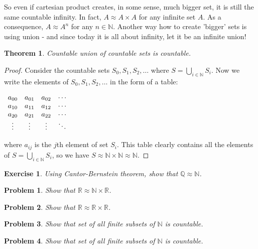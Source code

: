 \documentclass[11pt,a5paper]{article}
\newtheorem{theorem}{Theorem}
\newtheorem{exercise}{Exercise}
\newtheorem{problem}{Problem}
\begin{document}
\noindent So even if cartesian product creates, in some sense, much bigger set, it is still the same countable infinity. In fact, $A\approx A\times A$ for any infinite set $A$. As a consequence, $A\approx A^n$ for any $n\in \mathbb{N}$. Another way how to create 'bigger' sets is using union - and since today it is all about infinity, let it be an infinite union!
\begin{theorem}
Countable union of countable sets is countable.
\end{theorem}
\begin{proof} Consider the countable sets $S_0, S_1, S_2, \ldots$ where $\displaystyle S = \bigcup_{i \mathop \in \mathbb{N}} {S_i}$. Now we write the elements of $S_0, S_1, S_2, \ldots$ in the form of a table:

$\begin{array} {*{4}c} {a_{00}} & {a_{01}} & {a_{02}} & \cdots \\ {a_{10}} & {a_{11}} & {a_{12}} & \cdots \\ {a_{20}} & {a_{21}} & {a_{22}} & \cdots \\ \vdots & \vdots & \vdots & \ddots \\ \end{array}$

\noindent where $a_{ij}$ is the $j$th element of set $S_i$. This table clearly contains all the elements of $\displaystyle S = \bigcup_{i \mathop \in \mathbb{N}} {S_i}$, so we have $S \approx \mathbb{N}\times\mathbb{N} \approx \mathbb{N}$.
\end{proof}

\begin{exercise} Using Cantor-Bernstein theorem, show that $\mathbb{Q}\approx\mathbb{N}$. 
\end{exercise}
\begin{problem} Show that $\mathbb{R} \approx \mathbb{N} \times \mathbb{R}$.
\end{problem}
\begin{problem} Show that $\mathbb{R} \approx \mathbb{R} \times \mathbb{R}$.
\end{problem}
\begin{problem} Show that set of all finite subsets of $\mathbb{N}$ is countable.
\end{problem}
\begin{problem} Show that set of all finite subsets of $\mathbb{N}$ is countable.
\end{problem}
\end{document}

